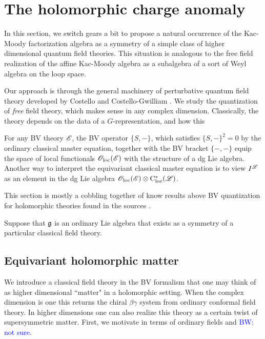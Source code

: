 \documentclass[10pt]{amsart}
\title{}
\def\brian{\textcolor{blue}{BW: }\textcolor{blue}}
\begin{document}
\maketitle
\tableofcontents

\section{The holomorphic charge anomaly}

In this section, we switch gears a bit to propose a natural occurrence of the Kac-Moody factorization algebra as a symmetry of a simple class of higher dimensional quantum field theories. 
This situation is analogous to the free field realization of the affine Kac-Moody algebra as a subalgebra of a sort of Weyl algebra on the loop space. 

Our approach is through the general machinery of perturbative quantum field theory developed by Costello \cite{CosBook} and Costello-Gwilliam \cite{CG1,CG2}.
We study the quantization of {\em free} field theory, which makes sense in any complex dimension.
Classically, the theory depends on the data of a $G$-representation, and  how this 

For any BV theory $\mathscr E$, the BV operator $\{S,-\}$, which satisfies $\{S,-\}^2 =0$ by the ordinary classical master equation, together with the BV bracket $\{-,-\}$ equip the space of local functionals ${\mathscr O}_{\rm loc}(\mathscr E)$ with the structure of a dg Lie algebra. 
Another way to interpret the equivariant classical master equation is to view $I^{\mathscr L}$ as an element in the dg Lie algebra ${\mathscr O}_{\rm loc}(\mathscr E) \otimes {\rm C}_{\rm loc}^*(\mathscr L)$.

This section is mostly a cobbling together of know results above BV quantization for holomorphic theories found in the sources \cite{CG2, BWhol}. 


Suppose that $\mathfrak g$ is an ordinary Lie algebra that exists as a symmetry of a particular classical field theory. 

\subsection{Equivariant holomorphic matter}

We introduce a classical field theory in the BV formalism that one may think of as higher dimensional ``matter" in a holomorphic setting. 
When the complex dimension is one this returns the chiral $\beta\gamma$ system from ordinary conformal field theory. 
In higher dimensions one can also realize this theory as a certain twist of supersymmetric matter. 
First, we motivate in terms of ordinary fields and \brian{not sure}. 
\end{document}
